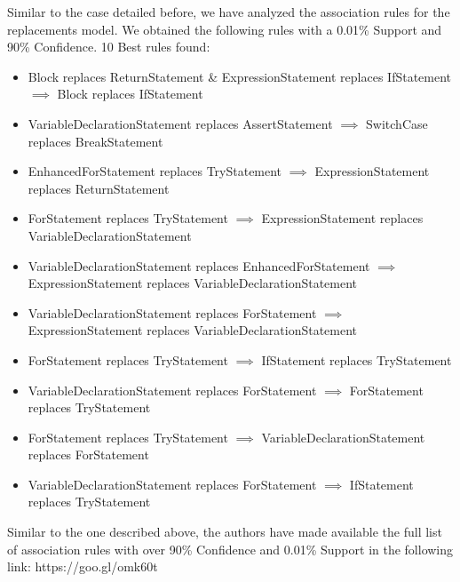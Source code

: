 \documentclass[conference]{IEEEtran}
\begin{document}
Similar to the case detailed before, we have analyzed the association rules for the replacements model. We obtained the following rules with a 0.01\% Support and 90\% Confidence.
10 Best rules found:
\begin{itemize}
\item Block replaces ReturnStatement \& ExpressionStatement replaces IfStatement $\implies$ Block replaces IfStatement
\item VariableDeclarationStatement replaces AssertStatement $\implies$ SwitchCase replaces BreakStatement
\item EnhancedForStatement replaces TryStatement $\implies$ ExpressionStatement replaces ReturnStatement
\item ForStatement replaces TryStatement $\implies$ ExpressionStatement replaces VariableDeclarationStatement
\item VariableDeclarationStatement replaces EnhancedForStatement $\implies$ ExpressionStatement replaces VariableDeclarationStatement
\item VariableDeclarationStatement replaces ForStatement $\implies$ ExpressionStatement replaces VariableDeclarationStatement
\item ForStatement replaces TryStatement $\implies$ IfStatement replaces TryStatement
\item VariableDeclarationStatement replaces ForStatement $\implies$ ForStatement replaces TryStatement
\item ForStatement replaces TryStatement $\implies$ VariableDeclarationStatement replaces ForStatement
\item VariableDeclarationStatement replaces ForStatement $\implies$ IfStatement replaces TryStatement
\end{itemize}

Similar to the one described above, the authors have made available the full list of association rules with over 90\% Confidence and 0.01\% Support in the following link: 
https://goo.gl/omk60t



\end{document}
